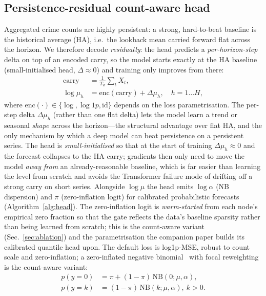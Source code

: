 \documentclass[11pt,conference]{IEEEtran}
\begin{document}
\subsection{Persistence-residual count-aware head}\label{sec:head}
Aggregated crime counts are highly persistent: a strong, hard-to-beat
baseline is the historical average (HA), i.e.\ the lookback mean carried
forward flat across the horizon. We therefore decode \emph{residually}: the
head predicts a \emph{per-horizon-step} delta on top of an encoded carry, so
the model starts exactly at the HA baseline (small-initialised head, $\Delta\approx0$)
and training only improves from there:
\begin{equation}\label{eq:residual}
\begin{split}
  \mathrm{carry} &= \tfrac{1}{T_w}\sum_{t} X_t,\\
  \log\mu_{h} &= \mathrm{enc}(\mathrm{carry}) + \Delta\mu_{h},\quad h=1\ldots H,
\end{split}
\end{equation}
where $\mathrm{enc}(\cdot)\in\{\log,\log1p,\mathrm{id}\}$ depends on the loss
parametrisation. The per-step delta $\Delta\mu_h$ (rather than one flat delta)
lets the model learn a trend or seasonal \emph{shape} across the horizon---the
structural advantage over flat HA, and the only mechanism by which a deep model
can beat persistence on a persistent series. The head is
\emph{small-initialised} so that at the start of training $\Delta\mu_h\approx0$
and the forecast collapses to the HA carry; gradients then only need to move
the model \emph{away from} an already-reasonable baseline, which is far easier
than learning the level from scratch and avoids the Transformer failure mode of
drifting off a strong carry on short series. Alongside $\log\mu$ the head emits
$\log\alpha$ (NB dispersion) and $\pi$ (zero-inflation logit) for calibrated
probabilistic forecasts (Algorithm~\ref{alg:head}). The zero-inflation logit is
\emph{warm-started} from each node's empirical zero fraction so that the gate
reflects the data's baseline sparsity rather than being learned from scratch;
this is the count-aware variant (Sec.~\ref{sec:ablation}) and the parametrisation
the companion paper builds its calibrated quantile head upon. The default loss is
log1p-MSE, robust to count scale and zero-inflation; a zero-inflated negative
binomial~\cite{lambert1992poisson,hilbe2011negativebinomial,yang2021zinb} with
focal reweighting~\cite{lin2017focal} is the count-aware variant:
\begin{equation}\label{eq:zinb}
\begin{split}
  p(y{=}0)&=\pi+(1{-}\pi)\,\mathrm{NB}(0;\mu,\alpha),\\
  p(y{=}k)&=(1{-}\pi)\,\mathrm{NB}(k;\mu,\alpha),\ k>0.
\end{split}
\end{equation}
\end{document}
